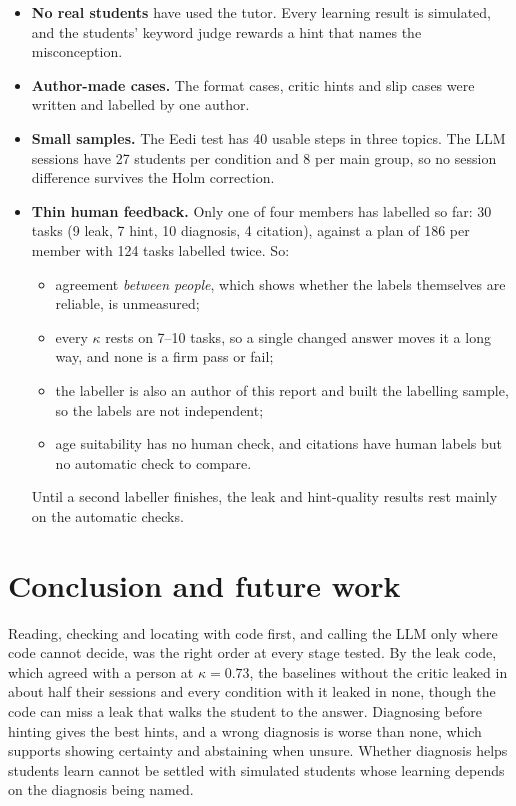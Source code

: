 \documentclass[11pt,a4paper]{article}
\begin{document}
\begin{itemize}
  \item \textbf{No real students} have used the tutor. Every learning result is simulated, and the students' keyword judge rewards a hint that names the misconception.
  \item \textbf{Author-made cases.} The format cases, critic hints and slip cases were written and labelled by one author.
  \item \textbf{Small samples.} The Eedi test has 40 usable steps in three topics. The LLM sessions have 27 students per condition and 8 per main group, so no session difference survives the Holm correction.
  \item \textbf{Thin human feedback.} Only one of four members has labelled so far: 30 tasks (9 leak, 7 hint, 10 diagnosis, 4 citation), against a plan of 186 per member with 124 tasks labelled twice. So:
  \begin{itemize}
    \item agreement \emph{between people}, which shows whether the labels themselves are reliable, is unmeasured;
    \item every $\kappa$ rests on 7--10 tasks, so a single changed answer moves it a long way, and none is a firm pass or fail;
    \item the labeller is also an author of this report and built the labelling sample, so the labels are not independent;
    \item age suitability has no human check, and citations have human labels but no automatic check to compare.
  \end{itemize}
  Until a second labeller finishes, the leak and hint-quality results rest mainly on the automatic checks.
\end{itemize}

\section{Conclusion and future work}

Reading, checking and locating with code first, and calling the LLM only where code cannot decide, was the right order at every stage tested. By the leak code, which agreed with a person at $\kappa = 0.73$, the baselines without the critic leaked in about half their sessions and every condition with it leaked in none, though the code can miss a leak that walks the student to the answer. Diagnosing before hinting gives the best hints, and a wrong diagnosis is worse than none, which supports showing certainty and abstaining when unsure. Whether diagnosis helps students learn cannot be settled with simulated students whose learning depends on the diagnosis being named.
\end{document}
